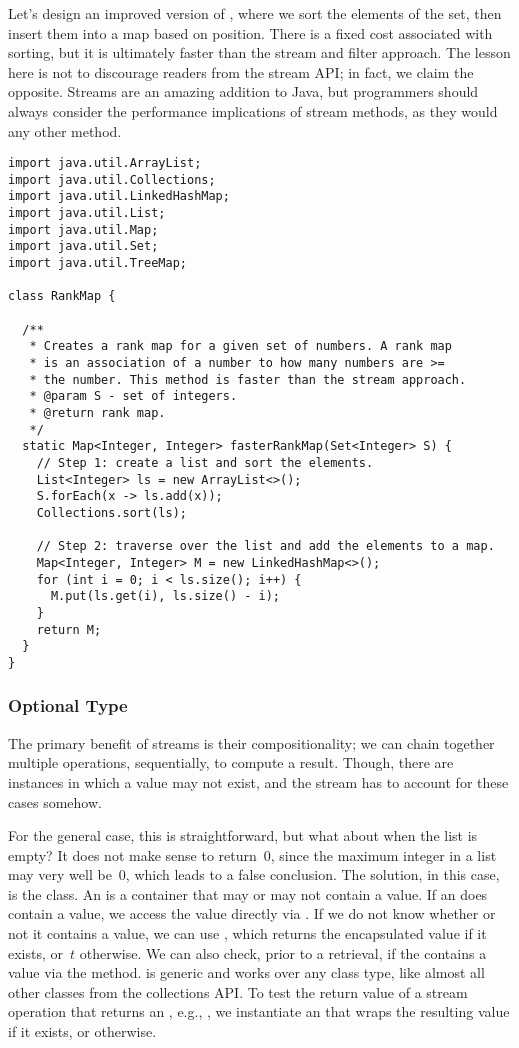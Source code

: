 Let's design an improved version of , where we sort the elements of the set, then insert them into a map based on position.
There is a fixed cost associated with sorting, but it is ultimately faster than the stream and filter approach.
The lesson here is not to discourage readers from the stream API; in fact, we claim the opposite.
Streams are an amazing addition to Java, but programmers should always consider the performance implications of stream methods, as they would any other method.

\begin{lstlisting}[language=MyJava]
import java.util.ArrayList;
import java.util.Collections;
import java.util.LinkedHashMap;
import java.util.List;
import java.util.Map;
import java.util.Set;
import java.util.TreeMap;

class RankMap {

  /**
   * Creates a rank map for a given set of numbers. A rank map
   * is an association of a number to how many numbers are >=
   * the number. This method is faster than the stream approach.
   * @param S - set of integers.
   * @return rank map.
   */
  static Map<Integer, Integer> fasterRankMap(Set<Integer> S) {
    // Step 1: create a list and sort the elements.
    List<Integer> ls = new ArrayList<>();
    S.forEach(x -> ls.add(x));
    Collections.sort(ls);

    // Step 2: traverse over the list and add the elements to a map.
    Map<Integer, Integer> M = new LinkedHashMap<>();
    for (int i = 0; i < ls.size(); i++) {
      M.put(ls.get(i), ls.size() - i);
    }
    return M;
  }
}
\end{lstlisting}

\subsubsection*{Optional Type}
The primary benefit of streams is their compositionality; we can chain together multiple operations, sequentially, to compute a result. 
Though, there are instances in which a value may not exist, and the stream has to account for these cases somehow.

For the general case, this is straightforward, but what about when the list is empty? 
It does not make sense to return~$0$, since the maximum integer in a list may very well be~$0$, which leads to a false conclusion. 
The solution, in this case, is the  class. 
An  is a container that may or may not contain a value. 
If an  does contain a value, we access the value directly via . 
If we do not know whether or not it contains a value, we can use , which returns the encapsulated value if it exists, or~$t$ otherwise. 
We can also check, prior to a retrieval, if the  contains a value via the  method. 
 is generic and works over any class type, like almost all other classes from the collections API. 
To test the return value of a stream operation that returns an , e.g., , we instantiate an  that wraps the resulting value if it exists, or  otherwise.

